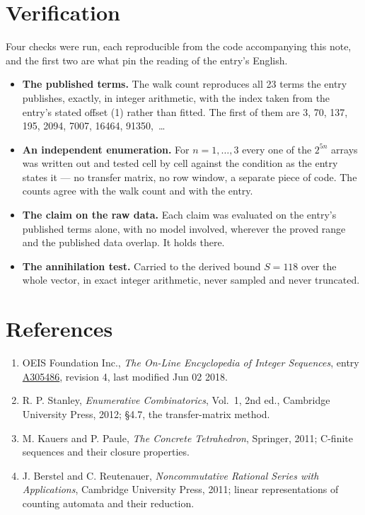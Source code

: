 \documentclass[11pt]{article}
\theoremstyle{definition}
\begin{document}
\section{Verification}

Four checks were run, each reproducible from the code accompanying this note, and the first two are what pin the reading of the entry's English.

\begin{itemize}

\item {\bfseries The published terms.} The walk count reproduces all 23 terms the entry publishes, exactly, in integer arithmetic, with the index taken from the entry's stated offset (1) rather than fitted. The first of them are 3, 70, 137, 195, 2094, 7007, 16464, 91350,~\dots

\item {\bfseries An independent enumeration.} For $n = 1,\dots,3$ every one of the $2^{5n}$ arrays was written out and tested cell by cell against the condition as the entry states it --- no transfer matrix, no row window, a separate piece of code. The counts agree with the walk count and with the entry.

\item {\bfseries The claim on the raw data.} Each claim was evaluated on the entry's published terms alone, with no model involved, wherever the proved range and the published data overlap. It holds there.

\item {\bfseries The annihilation test.} Carried to the derived bound $S = 118$ over the whole vector, in exact integer arithmetic, never sampled and never truncated.

\end{itemize}

\section{References}

\begin{enumerate}

\item OEIS Foundation Inc., \emph{The On-Line Encyclopedia of Integer Sequences}, entry \href{https://oeis.org/A305486}{A305486}, revision 4, last modified Jun 02 2018.

\item R. P. Stanley, \emph{Enumerative Combinatorics}, Vol.~1, 2nd ed., Cambridge University Press, 2012; \S4.7, the transfer-matrix method.

\item M. Kauers and P. Paule, \emph{The Concrete Tetrahedron}, Springer, 2011; C-finite sequences and their closure properties.

\item J. Berstel and C. Reutenauer, \emph{Noncommutative Rational Series with Applications}, Cambridge University Press, 2011; linear representations of counting automata and their reduction.

\end{enumerate}
\end{document}
